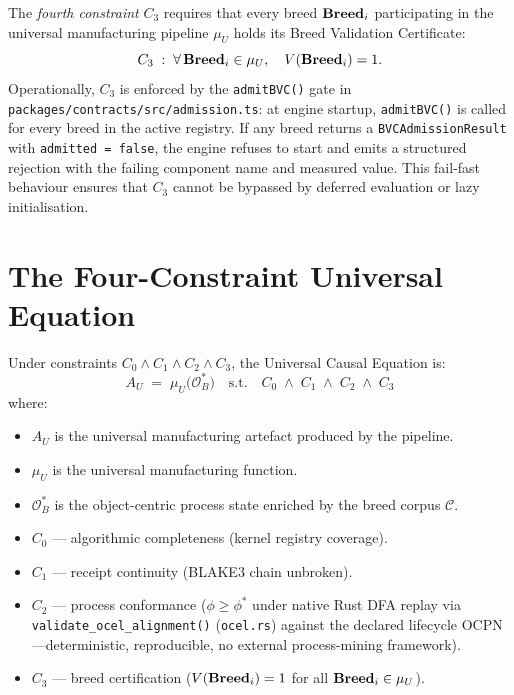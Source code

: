 \begin{definition}
\label{def:fourth-constraint}
\label{def:fourth-constraint-ucq}
The \emph{fourth constraint} $C_3$ requires that every breed $\mathbf{Breed}_i$ participating
in the universal manufacturing pipeline $\mu_U$ holds its Breed Validation Certificate:
\[
  C_3 \;:\; \forall\, \mathbf{Breed}_i \in \mu_U,\quad V(\mathbf{Breed}_i) = 1.
\]
Operationally, $C_3$ is enforced by the \texttt{admitBVC()} gate in
\texttt{packages/contracts/src/admission.ts}: at engine startup, \texttt{admitBVC()}
is called for every breed in the active registry. If any breed returns a
\texttt{BVCAdmissionResult} with \texttt{admitted = false}, the engine refuses to
start and emits a structured rejection with the failing component name and measured
value. This fail-fast behaviour ensures that $C_3$ cannot be bypassed by deferred
evaluation or lazy initialisation.
\end{definition}

\section{The Four-Constraint Universal Equation}
\label{sec:four-constraint-equation}

\begin{theorem}
\label{thm:four-constraint-equation}
Under constraints $C_0 \wedge C_1 \wedge C_2 \wedge C_3$, the Universal Causal
Equation is:
\[
  \boxed{A_U \;=\; \mu_U\!\bigl(\mathcal{O}^*_B\bigr)
  \quad\text{s.t.}\quad
  C_0 \;\wedge\; C_1 \;\wedge\; C_2 \;\wedge\; C_3}
\]
where:
\begin{itemize}
  \item $A_U$ is the universal manufacturing artefact produced by the pipeline.
  \item $\mu_U$ is the universal manufacturing function.
  \item $\mathcal{O}^*_B$ is the object-centric process state enriched by the breed
        corpus $\mathcal{C}$.
  \item $C_0$ — algorithmic completeness (kernel registry coverage).
  \item $C_1$ — receipt continuity (BLAKE3 chain unbroken).
  \item $C_2$ — process conformance ($\phi \geq \phi^*$ under native Rust DFA replay via \texttt{validate\_ocel\_alignment()} (\texttt{ocel.rs}) against the declared lifecycle OCPN---deterministic, reproducible, no external process-mining framework).
  \item $C_3$ — breed certification ($V(\mathbf{Breed}_i) = 1$ for all $\mathbf{Breed}_i \in \mu_U$).
\end{itemize}
\end{theorem}


